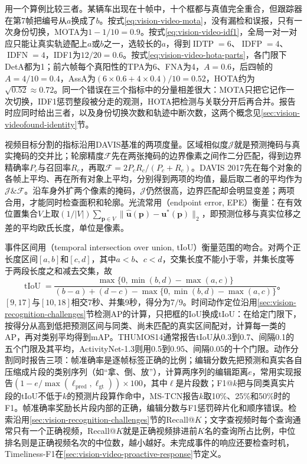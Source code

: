 用一个算例比较三者。某辆车出现在十帧中，十个框都与真值完全重合，但跟踪器在第7帧把编号从$a$换成了$b$。按式\eqref{eq:vision-video-mota}，没有漏检和误报，只有一次身份切换，MOTA为$1-1/10=0.9$。按式\eqref{eq:vision-video-idf1}，全局一对一对应只能让真实轨迹配上$a$或$b$之一，选较长的$a$，得到$\operatorname{IDTP}=6$、$\operatorname{IDFP}=4$、$\operatorname{IDFN}=4$，IDF1为$12/20=0.6$。按式\eqref{eq:vision-video-hota-parts}，各门限下DetA都为1；前六帧每个真阳性的TPA为6、FNA为4，$A=0.6$，后四帧的$A=4/10=0.4$，AssA为$(6\times0.6+4\times0.4)/10=0.52$，HOTA约为$\sqrt{0.52}\approx0.72$。同一个错误在三个指标中的分量相差很大：MOTA只把它记作一次切换，IDF1惩罚整段被分走的观测，HOTA把检测与关联分开后再合并。报告时应同时给出三者，以及身份切换次数和轨迹中断次数，这两个概念见\ref{sec:vision-videofound-identity}节。

视频目标分割的指标沿用DAVIS基准的两项度量。区域相似度$\mathcal{J}$就是预测掩码与真实掩码的交并比；轮廓精度$\mathcal{F}$先在两张掩码的边界像素之间作二分匹配，得到边界精确率$P_c$与召回率$R_c$，再取$\mathcal{F}=2P_cR_c/(P_c+R_c)$。DAVIS 2017先在每个对象的各帧上平均、再在所有对象上平均，分别得到两项的均值，最后取二者的平均作为$\mathcal{J}\&\mathcal{F}$。沿车身外扩两个像素的掩码，$\mathcal{J}$仍然很高，边界匹配却会明显变差；两项合用，才能同时检查面积和轮廓。光流常用（endpoint error, EPE）衡量：在有效位置集合$V$上取$(1/|V|)\sum_{\bm{p}\in V}\lVert\widehat{\bm{u}}(\bm{p})-\bm{u}^*(\bm{p})\rVert_2$，即预测位移与真实位移之差的平均欧氏长度，单位是像素。

事件区间用（temporal intersection over union, tIoU）衡量范围的吻合。对两个正长度区间$[a,b]$和$[c,d]$，其中$a<b$、$c<d$，交集长度不能小于零，并集长度等于两段长度之和减去交集，故
\begin{equation}
  \operatorname{tIoU}
  =\frac{\max\{0,\min(b,d)-\max(a,c)\}}
  {(b-a)+(d-c)-\max\{0,\min(b,d)-\max(a,c)\}}\text{。}
  \label{eq:vision-video-tiou}
\end{equation}
$[9,17]$与$[10,18]$相交7秒、并集9秒，得分为$7/9$。时间动作定位沿用\ref{sec:vision-recognition-challenges}节检测AP的计算，只把框的IoU换成tIoU：在给定门限下，按得分从高到低把预测区间与同类、尚未匹配的真实区间配对，计算每一类的AP，再对类别平均得到mAP。THUMOS14通常报告tIoU从0.3到0.7、间隔0.1的五个门限及其平均，ActivityNet-1.3则用0.5到0.95、间隔0.05的十个门限。动作分割同时报告三项：帧准确率是逐帧标签正确的比例；编辑分数先把预测和真实各自压缩成片段的类别序列（如“拿、倒、放”），计算两序列的编辑距离$e$，常用实现报告$(1-e/\max(\ell_{\mathrm{pred}},\ell_{\mathrm{gt}}))\times100$，其中$\ell$是片段数；F1@$k$把与同类真实片段的tIoU不低于$k$的预测片段算作命中，MS-TCN报告$k$取10\%、25\%和50\%时的F1。帧准确率奖励长片段内部的正确，编辑分数与F1惩罚碎片化和顺序错误。检索沿用\ref{sec:vision-recognition-challenges}节的Recall@$K$；文字查视频时每个查询通常只有一个正确视频，Recall@$K$就是正确视频排进前$K$名的查询所占比例，中位排名则是正确视频名次的中位数，越小越好。未完成事件的响应还要检查时机，Timeliness-F1在\ref{sec:vision-video-proactive-response}节定义。

